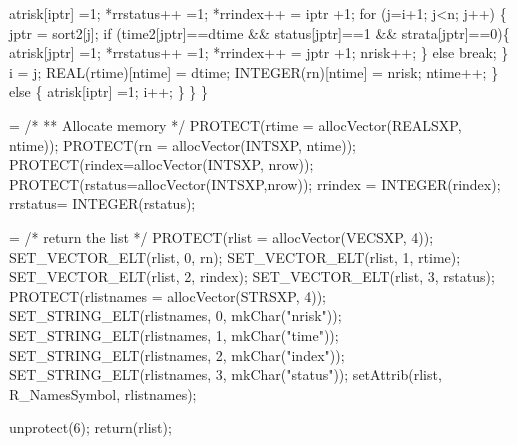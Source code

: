 \documentclass{article}
\begin{document}
\begin{nwchunk}
             atrisk[iptr] =1;
             *rrstatus++ =1; 
             *rrindex++ = iptr +1;
             for (j=i+1; j<n; j++) \{
                 jptr = sort2[j];
                 if (time2[jptr]==dtime && status[jptr]==1 && strata[jptr]==0)\{
                     atrisk[jptr] =1;
                     *rrstatus++ =1;
                     *rrindex++ = jptr +1;
                     nrisk++;
                     \}
                 else break;
                 \}
             i = j;
             REAL(rtime)[ntime] = dtime;
             INTEGER(rn)[ntime] = nrisk;
             ntime++;
         \}
         else \{
             atrisk[iptr] =1;
             i++;
         \}
     \}    
 \}
\end{nwchunk}

\begin{nwchunk}
=
 /*
 **  Allocate memory
 */
 PROTECT(rtime = allocVector(REALSXP, ntime));
 PROTECT(rn = allocVector(INTSXP, ntime));
 PROTECT(rindex=allocVector(INTSXP, nrow));
 PROTECT(rstatus=allocVector(INTSXP,nrow));
 rrindex = INTEGER(rindex);
 rrstatus= INTEGER(rstatus);
\end{nwchunk}

\begin{nwchunk}
=
 /* return the list */
 PROTECT(rlist = allocVector(VECSXP, 4));
 SET_VECTOR_ELT(rlist, 0, rn);
 SET_VECTOR_ELT(rlist, 1, rtime);
 SET_VECTOR_ELT(rlist, 2, rindex);
 SET_VECTOR_ELT(rlist, 3, rstatus);
 PROTECT(rlistnames = allocVector(STRSXP, 4));
 SET_STRING_ELT(rlistnames, 0, mkChar("nrisk"));
 SET_STRING_ELT(rlistnames, 1, mkChar("time"));
 SET_STRING_ELT(rlistnames, 2, mkChar("index"));
 SET_STRING_ELT(rlistnames, 3, mkChar("status"));
 setAttrib(rlist, R_NamesSymbol, rlistnames);
 
 unprotect(6);
 return(rlist);
\end{nwchunk}
 
\end{document}
